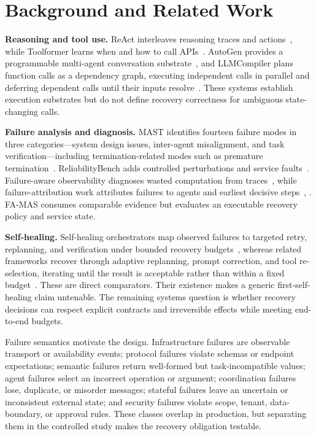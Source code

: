 \documentclass[10pt,journal,compsoc]{IEEEtran}
\newcommand{\famas}{FA-MAS}
\begin{document}
\section{Background and Related Work}\label{sec:related}
\textbf{Reasoning and tool use.} ReAct interleaves reasoning traces and actions~\cite{yao2023react}, while Toolformer learns when and how to call APIs~\cite{schick2023toolformer}. AutoGen provides a programmable multi-agent conversation substrate~\cite{wu2024autogen}, and LLMCompiler plans function calls as a dependency graph, executing independent calls in parallel and deferring dependent calls until their inputs resolve~\cite{kim2024llmcompiler}. These systems establish execution substrates but do not define recovery correctness for ambiguous state-changing calls.

\textbf{Failure analysis and diagnosis.} MAST identifies fourteen failure modes in three categories---system design issues, inter-agent misalignment, and task verification---including termination-related modes such as premature termination~\cite{cemri2025mast}. ReliabilityBench adds controlled perturbations and service faults~\cite{gupta2026reliabilitybench}. Failure-aware observability diagnoses wasted computation from traces~\cite{li2026wasted}, while failure-attribution work attributes failures to agents and earliest decisive steps~\cite{zhang2025whichagent}, \cite{xia2026agentlocate}. \famas{} consumes comparable evidence but evaluates an executable recovery policy and service state.

\textbf{Self-healing.} Self-healing orchestrators map observed failures to targeted retry, replanning, and verification under bounded recovery budgets~\cite{babu2026selfhealing}, whereas related frameworks recover through adaptive replanning, prompt correction, and tool re-selection, iterating until the result is acceptable rather than within a fixed budget~\cite{jeong2026selfhealing}. These are direct comparators. Their existence makes a generic first-self-healing claim untenable. The remaining systems question is whether recovery decisions can respect explicit contracts and irreversible effects while meeting end-to-end budgets.

Failure semantics motivate the design. Infrastructure failures are observable transport or availability events; protocol failures violate schemas or endpoint expectations; semantic failures return well-formed but task-incompatible values; agent failures select an incorrect operation or argument; coordination failures lose, duplicate, or misorder messages; stateful failures leave an uncertain or inconsistent external state; and security failures violate scope, tenant, data-boundary, or approval rules. These classes overlap in production, but separating them in the controlled study makes the recovery obligation testable.
\end{document}
